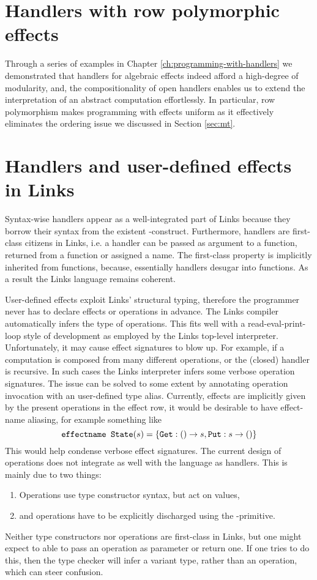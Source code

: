\section{Handlers with row polymorphic effects}\label{sec:eval-abs}
Through a series of examples in Chapter \ref{ch:programming-with-handlers} we demonstrated that handlers for algebraic effects indeed afford a high-degree of modularity, and, the compositionality of open handlers enables us to extend the interpretation of an abstract computation effortlessly. In particular, row polymorphism makes programming with effects uniform as it effectively eliminates the ordering issue we discussed in Section \ref{sec:mt}.



\section{Handlers and user-defined effects in Links}
Syntax-wise handlers appear as a well-integrated part of Links because they borrow their syntax from the existent -construct.
Furthermore, handlers are first-class citizens in Links, i.e. a handler can be passed as argument to a function, returned from a function or assigned a name. The first-class property is implicitly inherited from functions, because, essentially handlers desugar into functions.
As a result the Links language remains coherent.

User-defined effects exploit Links' structural typing, therefore the programmer never has to declare effects or operations in advance. The Links compiler automatically infers the type of operations. This fits well with a read-eval-print-loop style of development as employed by the Links top-level interpreter. Unfortunately, it may cause effect signatures to blow up. For example, if a computation is composed from many different operations, or the (closed) handler is recursive. In such cases the Links interpreter infers some verbose operation signatures. The issue can be solved to some extent by annotating operation invocation with an user-defined type alias. Currently, effects are implicitly given by the present operations in the effect row, it would be desirable to have effect-name aliasing, for example something like
\[ \texttt{effectname State}(s) = \{\texttt{Get}: () \to s, \texttt{Put}: s \to ()\} \]
This would help condense verbose effect signatures. The current design of operations does not integrate as well with the language as handlers. This is mainly due to two things:
\begin{enumerate}
  \item Operations use type constructor syntax, but act on values,
  \item and operations have to be explicitly discharged using the -primitive.
\end{enumerate}
Neither type constructors nor operations are first-class in Links, but one might expect to able to pass an operation as parameter or return one. If one tries to do this, then the type checker will infer a variant type, rather than an operation, which can steer confusion.

